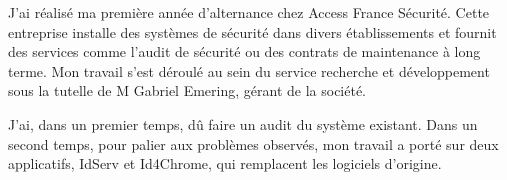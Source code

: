 J'ai réalisé ma première année d'alternance chez Access France Sécurité. Cette entreprise installe des systèmes de sécurité dans divers établissements et fournit des services comme l'audit de sécurité ou des contrats de maintenance à long terme. Mon travail s'est déroulé au sein du service recherche et développement sous la tutelle de M Gabriel Emering, gérant de la société.

J'ai, dans un premier temps, dû faire un audit du système existant. Dans un second temps, pour palier aux problèmes observés, mon travail a porté sur deux applicatifs, IdServ et Id4Chrome, qui remplacent les logiciels d'origine.